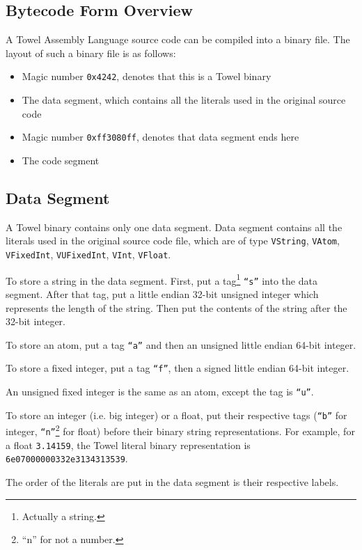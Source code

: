 \documentclass{article}
\begin{document}
\subsection{Bytecode Form Overview}

A Towel Assembly Language source code can be compiled into a binary file. The layout of such a binary file is as follows:
\begin{itemize}
\item Magic number \texttt{0x4242}, denotes that this is a Towel binary
\item The data segment, which contains all the literals used in the original source code
\item Magic number \texttt{0xff3080ff}, denotes that data segment ends here
\item The code segment
\end{itemize}

\subsection{Data Segment}
A Towel binary contains only one data segment. Data segment contains all the literals used in the original source code file, which are of type \texttt{VString}, \texttt{VAtom}, \texttt{VFixedInt}, \texttt{VUFixedInt}, \texttt{VInt}, \texttt{VFloat}.

To store a string in the data segment. First, put a tag\footnote{Actually a string.} \texttt{``s''} into the data segment. After that tag, put a little endian 32-bit unsigned integer which represents the length of the string. Then put the contents of the string after the 32-bit integer.

To store an atom, put a tag \texttt{``a''} and then an unsigned little endian 64-bit integer.

To store a fixed integer, put a tag \texttt{``f''}, then a signed little endian 64-bit integer.

An unsigned fixed integer is the same as an atom, except the tag is \texttt{``u''}.

To store an integer (i.e. big integer) or a float, put their respective tags (\texttt{``b''} for integer, \texttt{``n''}\footnote{``n'' for not a number.} for float) before their binary string representations. For example, for a float \texttt{3.14159}, the Towel literal binary representation is \texttt{6e07000000332e3134313539}.

The order of the literals are put in the data segment is their respective labels.
\end{document}
